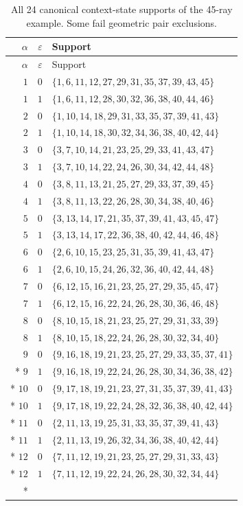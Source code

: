 \documentclass[aps,pra,reprint,superscriptaddress,longbibliography,nofootinbib,floatfix,10pt]{revtex4-2}
\theoremstyle{definition}
\begin{document}
\begin{longtable}{rrl}
\caption{All 24 canonical context-state supports of the 45-ray example. Some fail geometric pair exclusions.}\label{tab:cabello45-canonical}\\
\toprule
$\alpha$ & $\varepsilon$ & Support\\\midrule
\endfirsthead
\toprule
$\alpha$ & $\varepsilon$ & Support\\\midrule
\endhead
\bottomrule\endfoot
$1$ & $0$ & $\{1,6,11,12,27,29,31,35,37,39,43,45\}$\\
$1$ & $1$ & $\{1,6,11,12,28,30,32,36,38,40,44,46\}$\\
$2$ & $0$ & $\{1,10,14,18,29,31,33,35,37,39,41,43\}$\\
$2$ & $1$ & $\{1,10,14,18,30,32,34,36,38,40,42,44\}$\\
$3$ & $0$ & $\{3,7,10,14,21,23,25,29,33,41,43,47\}$\\
$3$ & $1$ & $\{3,7,10,14,22,24,26,30,34,42,44,48\}$\\
$4$ & $0$ & $\{3,8,11,13,21,25,27,29,33,37,39,45\}$\\
$4$ & $1$ & $\{3,8,11,13,22,26,28,30,34,38,40,46\}$\\
$5$ & $0$ & $\{3,13,14,17,21,35,37,39,41,43,45,47\}$\\
$5$ & $1$ & $\{3,13,14,17,22,36,38,40,42,44,46,48\}$\\
$6$ & $0$ & $\{2,6,10,15,23,25,31,35,39,41,43,47\}$\\
$6$ & $1$ & $\{2,6,10,15,24,26,32,36,40,42,44,48\}$\\
$7$ & $0$ & $\{6,12,15,16,21,23,25,27,29,35,45,47\}$\\
$7$ & $1$ & $\{6,12,15,16,22,24,26,28,30,36,46,48\}$\\
$8$ & $0$ & $\{8,10,15,18,21,23,25,27,29,31,33,39\}$\\
$8$ & $1$ & $\{8,10,15,18,22,24,26,28,30,32,34,40\}$\\
$9$ & $0$ & $\{9,16,18,19,21,23,25,27,29,33,35,37,41\}$\\*
$9$ & $1$ & $\{9,16,18,19,22,24,26,28,30,34,36,38,42\}$\\*
$10$ & $0$ & $\{9,17,18,19,21,23,27,31,35,37,39,41,43\}$\\*
$10$ & $1$ & $\{9,17,18,19,22,24,28,32,36,38,40,42,44\}$\\*
$11$ & $0$ & $\{2,11,13,19,25,31,33,35,37,39,41,43\}$\\*
$11$ & $1$ & $\{2,11,13,19,26,32,34,36,38,40,42,44\}$\\*
$12$ & $0$ & $\{7,11,12,19,21,23,25,27,29,31,33,43\}$\\*
$12$ & $1$ & $\{7,11,12,19,22,24,26,28,30,32,34,44\}$\\*
\end{longtable}
\end{document}
